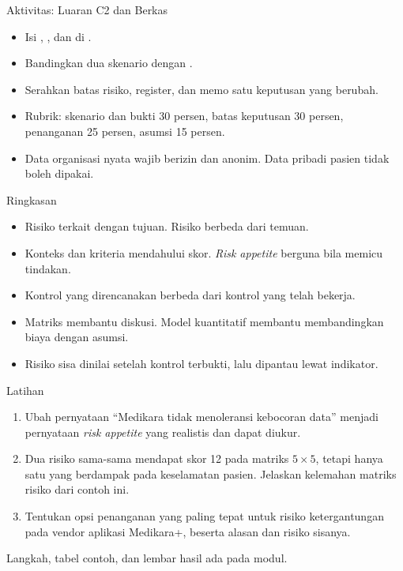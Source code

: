 \documentclass[aspectratio=169, table, 12pt]{beamer}
\begin{document}
\begin{frame}{{\Large Aktivitas: Luaran C2 dan Berkas}}
  \vspace{6pt}
  \small
  \begin{itemize}
    \item Isi , , dan 
          di .
    \item Bandingkan dua skenario dengan .
    \item Serahkan batas risiko, register, dan memo satu keputusan yang berubah.
    \item Rubrik: skenario dan bukti 30 persen, batas keputusan 30 persen, penanganan 25 persen,
          asumsi 15 persen.
    \item Data organisasi nyata wajib berizin dan anonim. Data pribadi pasien tidak boleh dipakai.
  \end{itemize}
\end{frame}

\begin{frame}{{\Large Ringkasan}}
  \vspace{6pt}
  \small
  \begin{itemize}
    \item Risiko terkait dengan tujuan. Risiko berbeda dari temuan.
    \item Konteks dan kriteria mendahului skor. \textit{Risk appetite} berguna bila memicu tindakan.
    \item Kontrol yang direncanakan berbeda dari kontrol yang telah bekerja.
    \item Matriks membantu diskusi. Model kuantitatif membantu membandingkan biaya dengan asumsi.
    \item Risiko sisa dinilai setelah kontrol terbukti, lalu dipantau lewat indikator.
  \end{itemize}
\end{frame}

\begin{frame}{{\Large Latihan}}
  \vspace{6pt}
  \small
  \begin{enumerate}
    \item Ubah pernyataan ``Medikara tidak menoleransi kebocoran data'' menjadi pernyataan \textit{risk
          appetite} yang realistis dan dapat diukur.
    \item Dua risiko sama-sama mendapat skor 12 pada matriks $5 \times 5$, tetapi hanya satu yang
          berdampak pada keselamatan pasien. Jelaskan kelemahan matriks risiko dari contoh ini.
    \item Tentukan opsi penanganan yang paling tepat untuk risiko ketergantungan pada vendor aplikasi
          Medikara+, beserta alasan dan risiko sisanya.
  \end{enumerate}

  \vspace{4pt}
  Langkah, tabel contoh, dan lembar hasil ada pada modul.
\end{frame}
\end{document}
